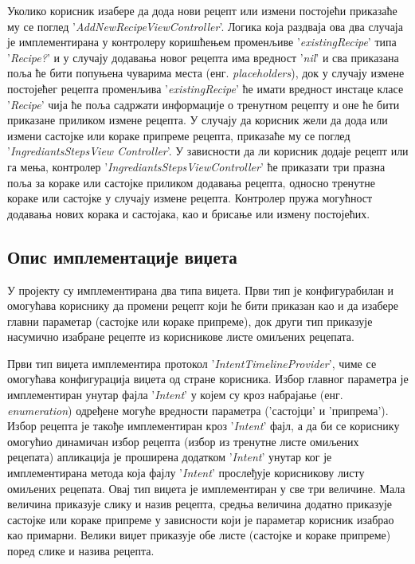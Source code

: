 \documentclass[12pt,oneside]{memoir}
\begin{document}
Уколико корисник изабере да дода нови рецепт или измени постојећи приказаће му се поглед '\textit{AddNewRecipeViewController}'. Логика која раздваја ова два случаја је имплементирана у контролеру коришћењем променљиве '\textit{existingRecipe}' типа '\textit{Recipe?}' и у случају додавања новог рецепта има вредност '\textit{nil}' и сва приказана поља ће бити попуњена чуварима места (енг. \textit{placeholders}), док у случају измене постојећег рецепта променљива '\textit{existingRecipe}' ће имати вредност инстаце класе '\textit{Recipe}' чија ће поља садржати информације о тренутном рецепту и оне ће бити приказане приликом измене рецепта. У случају да корисник жели да дода или измени састојке или кораке припреме рецепта, приказаће му се поглед '\textit{IngrediantsStepsView Controller}'. У зависности да ли корисник додаје рецепт или га мења, контролер '\textit{IngrediantsStepsViewController}' ће приказати три празна поља за кораке или састојке приликом додавања рецепта, односно тренутне кораке или састојке у случају измене рецепта. Контролер пружа могућност додавања нових корака и састојака, као и брисање или измену постојећих.

\subsection{Опис имплементације виџета}

У пројекту су имплементирана два типа виџета. Први тип је конфигурабилан и омогућава кориснику да промени рецепт који ће бити приказан као и да изабере главни параметар (састојке или кораке припреме), док други тип приказује насумично изабране рецепте из корисникове листе омиљених рецепата.

Први тип виџета имплементира протокол '\textit{IntentTimelineProvider}', чиме се омогућава конфигурација виџета од стране корисника. Избор главног параметра је имплементиран унутар фајла '\textit{Intent}' у којем су кроз набрајање (енг. \textit{enumeration}) одређене могуће вредности параметра ('састојци' и 'припрема'). Избор рецепта је такође имплементиран кроз '\textit{Intent}' фајл, а да би се кориснику омогућио динамичан избор рецепта (избор из тренутне листе омиљених рецепата) апликација је проширена додатком '\textit{Intent}' унутар ког је имплементирана метода која фајлу '\textit{Intent}' прослеђује корисникову листу омиљених рецепата. Овај тип виџета је имплементиран у све три величине. Мала величина приказује слику и назив рецепта, средња величина додатно приказује састојке или кораке припреме у зависности који је параметар корисник изабрао као примарни. Велики виџет приказује обе листе (састојке и кораке припреме) поред слике и назива рецепта.
\end{document}
